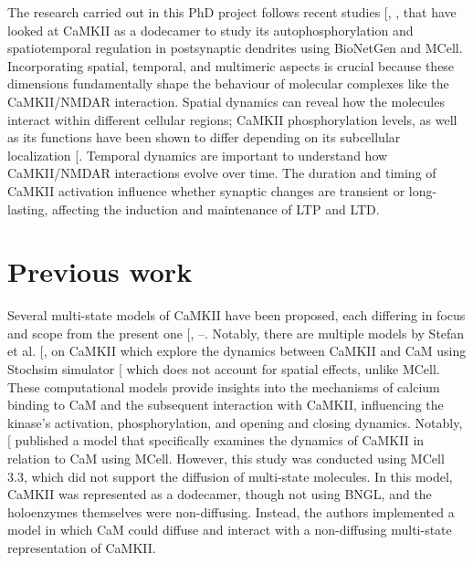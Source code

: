 \documentclass[
  11pt,
  letterpaper,
]{scrreprt}
\begin{document}
The research carried out in this PhD project follows recent studies
{[},
,
\citeproc{ref-bartol2024Spatial}{436}{]} that have looked at CaMKII as a
dodecamer to study its autophosphorylation and spatiotemporal regulation
in postsynaptic dendrites using BioNetGen and MCell. Incorporating
spatial, temporal, and multimeric aspects is crucial because these
dimensions fundamentally shape the behaviour of molecular complexes like
the CaMKII/NMDAR interaction. Spatial dynamics can reveal how the
molecules interact within different cellular regions; CaMKII
phosphorylation levels, as well as its functions have been shown to
differ depending on its subcellular localization
{[}\citeproc{ref-davies2007ACaMKII}{437}{]}. Temporal dynamics are
important to understand how CaMKII/NMDAR interactions evolve over time.
The duration and timing of CaMKII activation influence whether synaptic
changes are transient or long-lasting, affecting the induction and
maintenance of LTP and LTD.

\section{Previous work}\label{previous-work}

Several multi-state models of CaMKII have been proposed, each differing
in focus and scope from the present one
{[},
--\citeproc{ref-bartol2024Spatial}{436}{]}.
Notably, there are multiple models by Stefan et al.
{[},
\citeproc{ref-stefan2011MultiStage}{433}{]} on CaMKII which explore the
dynamics between CaMKII and CaM using Stochsim simulator
{[}\citeproc{ref-lenovere2001StochSim}{438}{]} which does not account
for spatial effects, unlike MCell. These computational models provide
insights into the mechanisms of calcium binding to CaM and the
subsequent interaction with CaMKII, influencing the kinase's activation,
phosphorylation, and opening and closing dynamics. Notably,
{[}\citeproc{ref-pharris2019Multistate}{185}{]} published a model that
specifically examines the dynamics of CaMKII in relation to CaM using
MCell. However, this study was conducted using MCell 3.3, which did not
support the diffusion of multi-state molecules. In this model, CaMKII
was represented as a dodecamer, though not using BNGL, and the
holoenzymes themselves were non-diffusing. Instead, the authors
implemented a model in which CaM could diffuse and interact with a
non-diffusing multi-state representation of CaMKII.
\end{document}
